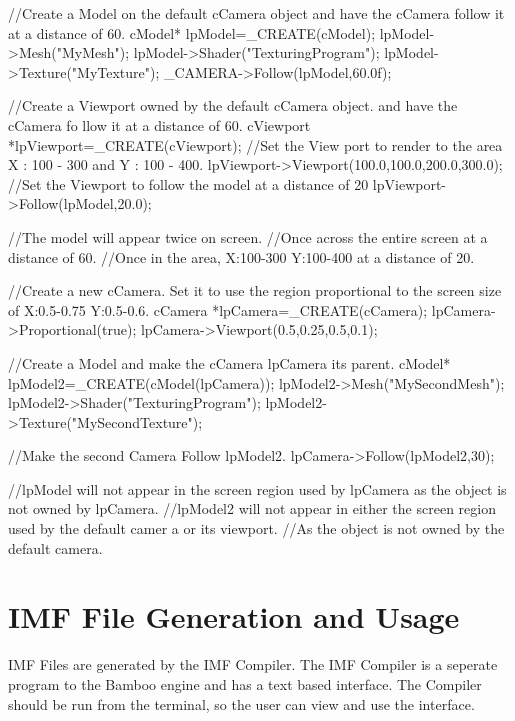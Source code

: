 \begin{DoxyCode}
 //Create a Model on the default cCamera object and have the cCamera follow it at
       a distance of 60.
 cModel* lpModel=_CREATE(cModel);
 lpModel->Mesh("MyMesh");
 lpModel->Shader("TexturingProgram");
 lpModel->Texture("MyTexture");
 _CAMERA->Follow(lpModel,60.0f);

 //Create a Viewport owned by the default cCamera object. and have the cCamera fo
      llow it at a distance of 60.
 cViewport *lpViewport=_CREATE(cViewport);
 //Set the View port to render to the area X : 100 - 300 and Y : 100 - 400.
 lpViewport->Viewport(100.0,100.0,200.0,300.0);
 //Set the Viewport to follow the model at a distance of 20
 lpViewport->Follow(lpModel,20.0);

 //The model will appear twice on screen.
 //Once across the entire screen at a distance of 60.
 //Once in the area, X:100-300 Y:100-400 at a distance of 20.


 //Create a new cCamera. Set it to use the region proportional to the screen size
       of X:0.5-0.75 Y:0.5-0.6.
 cCamera *lpCamera=_CREATE(cCamera);
 lpCamera->Proportional(true);
 lpCamera->Viewport(0.5,0.25,0.5,0.1);

 //Create a Model and make the cCamera lpCamera its parent.
 cModel* lpModel2=_CREATE(cModel(lpCamera));
 lpModel2->Mesh("MySecondMesh");
 lpModel2->Shader("TexturingProgram");
 lpModel2->Texture("MySecondTexture");

 //Make the second Camera Follow lpModel2.
 lpCamera->Follow(lpModel2,30);

 //lpModel will not appear in the screen region used by lpCamera as the object is
       not owned by lpCamera.
 //lpModel2 will not appear in either the screen region used by the default camer
      a or its viewport.
 //As the object is not owned by the default camera.
\end{DoxyCode}
 \hypertarget{_using_engine_page_IMFGenerationPage}{}\section{IMF File Generation and Usage}\label{_using_engine_page_IMFGenerationPage}
IMF Files are generated by the IMF Compiler. The IMF Compiler is a seperate program to the Bamboo engine and has a text based interface. The Compiler should be run from the terminal, so the user can view and use the interface.

